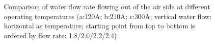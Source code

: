 \begin{figure}[ht]
{\begin{tikzpicture}[scale=0.6]
		\end{tikzpicture}
	}
	\caption{Comparison of water flow rate flowing out of the air side at different operating temperatures (a:120A; b:210A; c:300A; vertical water flow; horizontal as temperature; starting point from top to bottom is ordered by flow rate: 1.8/2.0/2.2/2.4)}
	\label{figure4}
\end{figure}